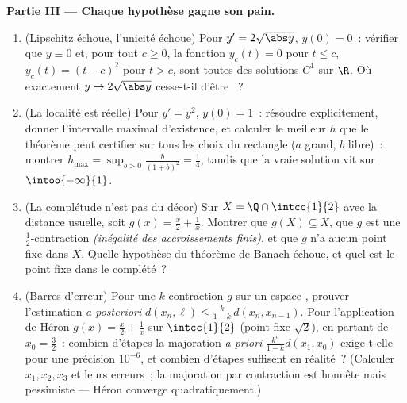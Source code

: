 \begin{problem}
\medskip
\noindent\textbf{Partie III --- Chaque hypothèse gagne son pain.}
\begin{enumerate}[resume]
  \item (Lipschitz échoue, l'unicité échoue) Pour $y' =
        2\sqrt{\abs y}$, $y(0) = 0$~: vérifier que $y \equiv 0$ et,
        pour tout $c \geq 0$, la fonction $y_c(t) = 0$ pour $t \leq
        c$, $y_c(t) = (t - c)^2$ pour $t > c$, sont toutes des
        solutions $C^1$ sur $\R$. Où exactement $y \mapsto
        2\sqrt{\abs y}$ cesse-t-il d'être ~?
  \item (La localité est réelle) Pour $y' = y^2$, $y(0) = 1$~:
        résoudre explicitement, donner l'intervalle maximal
        d'existence, et calculer le meilleur $h$ que le théorème
        peut certifier sur tous les choix du rectangle ($a$ grand,
        $b$ libre)~: montrer $h_{\max} = \sup_{b>0}
        \frac{b}{(1+b)^2} = \frac14$, tandis que la vraie solution
        vit sur $\intoo{-\infty}{1}$.
  \item (La complétude n'est pas du décor) Sur $X = \Q \cap
        \intcc{1}{2}$ avec la distance usuelle, soit $g(x) = \frac
        x2 + \frac1x$. Montrer que $g(X) \subseteq X$, que $g$ est
        une $\frac12$-contraction \emph{(inégalité des accroissements
        finis)}, et que $g$ n'a aucun point fixe dans $X$. Quelle
        hypothèse du théorème de Banach échoue, et quel est le point
        fixe dans le complété~?
  \item (Barres d'erreur) Pour une $k$-contraction $g$ sur un espace
        , prouver l'estimation \emph{a posteriori} $d(x_n,
        \ell) \leq \frac{k}{1-k}\,d(x_n, x_{n-1})$. Pour
        l'application de Héron $g(x) = \frac x2 + \frac 1x$ sur
        $\intcc{1}{2}$ (point fixe $\sqrt2$), en partant de $x_0 =
        \frac32$~: combien d'étapes la majoration \emph{a priori}
        $\frac{k^n}{1-k}d(x_1, x_0)$ exige-t-elle pour une précision
        $10^{-6}$, et combien d'étapes suffisent en réalité~?
        (Calculer $x_1, x_2, x_3$ et leurs erreurs~; la majoration
        par contraction est honnête mais pessimiste --- Héron
        converge quadratiquement.)
\end{enumerate}


\end{problem}
